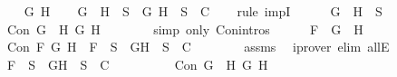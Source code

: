 \begin{isabellebody}
\ \ \isamarkupfalse%
\ G\ H\isanewline
\ \ \isamarkupfalse%
\ {\isachardoublequoteopen}\isactrlbold {\isasymnot}{\isacharparenleft}G\ \isactrlbold {\isasymrightarrow}\ H{\isacharparenright}\ {\isasymin}\ S\ {\isasymlongrightarrow}\ {\isacharbraceleft}G{\isacharcomma}\isactrlbold {\isasymnot}\ H{\isacharbraceright}\ {\isasymunion}\ S\ {\isasymin}\ C{\isachardoublequoteclose}\isanewline
\ \ \isamarkupfalse%
\ {\isacharparenleft}rule\ impI{\isacharparenright}\isanewline
\ \ \ \ \isamarkupfalse%
\ {\isachardoublequoteopen}\isactrlbold {\isasymnot}{\isacharparenleft}G\ \isactrlbold {\isasymrightarrow}\ H{\isacharparenright}\ {\isasymin}\ S{\isachardoublequoteclose}\isanewline
\ \ \ \ \isamarkupfalse%
\ \isamarkupfalse%
\ {\isachardoublequoteopen}Con\ {\isacharparenleft}\isactrlbold {\isasymnot}{\isacharparenleft}G\ \isactrlbold {\isasymrightarrow}\ H{\isacharparenright}{\isacharparenright}\ G\ {\isacharparenleft}\isactrlbold {\isasymnot}H{\isacharparenright}{\isachardoublequoteclose}\isanewline
\ \ \ \ \ \ \isamarkupfalse%
\ {\isacharparenleft}simp\ only{\isacharcolon}\ Con{\isachardot}intros{\isacharparenleft}{}{\isacharparenright}{\isacharparenright}\isanewline
\ \ \ \ \isamarkupfalse%
\ {\isacharquery}F\ {\isacharequal}\ {\isachardoublequoteopen}\isactrlbold {\isasymnot}{\isacharparenleft}G\ \isactrlbold {\isasymrightarrow}\ H{\isacharparenright}{\isachardoublequoteclose}\isanewline
\ \ \ \ \isamarkupfalse%
\ {\isachardoublequoteopen}Con\ {\isacharquery}F\ G\ {\isacharparenleft}\isactrlbold {\isasymnot}H{\isacharparenright}\ {\isasymlongrightarrow}\ {\isacharquery}F\ {\isasymin}\ S\ {\isasymlongrightarrow}\ {\isacharbraceleft}G{\isacharcomma}\isactrlbold {\isasymnot}H{\isacharbraceright}\ {\isasymunion}\ S\ {\isasymin}\ C{\isachardoublequoteclose}\isanewline
\ \ \ \ \ \ \isamarkupfalse%
\ assms\ \isamarkupfalse%
\ {\isacharparenleft}iprover\ elim{\isacharcolon}\ allE{\isacharparenright}\isanewline
\ \ \ \ \isamarkupfalse%
\ \isamarkupfalse%
\ {\isachardoublequoteopen}{\isacharquery}F\ {\isasymin}\ S\ {\isasymlongrightarrow}\ {\isacharbraceleft}G{\isacharcomma}\isactrlbold {\isasymnot}H{\isacharbraceright}\ {\isasymunion}\ S\ {\isasymin}\ C{\isachardoublequoteclose}\ \ \isanewline
\ \ \ \ \ \ \isamarkupfalse%
\ {\isacartoucheopen}Con\ {\isacharparenleft}\isactrlbold {\isasymnot}{\isacharparenleft}G\ \isactrlbold {\isasymrightarrow}\ H{\isacharparenright}{\isacharparenright}\ G\ {\isacharparenleft}\isactrlbold {\isasymnot}H{\isacharparenright}{\isacartoucheclose}\ \isamarkupfalse%

\end{isabellebody}
